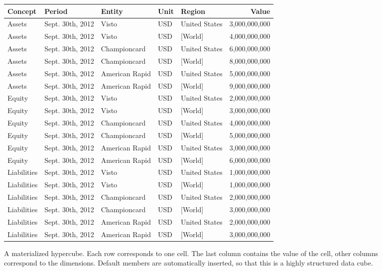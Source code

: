 \documentclass{acm_proc_article-sp}
\begin{document}
\begin{figure*}
\centering
\begin{tabular}{lllllr}
\hline
\hline
Concept & Period & Entity & Unit & Region & Value \\
\hline
Assets & Sept. 30th, 2012 & Visto & USD & United States & 3,000,000,000 \\
Assets & Sept. 30th, 2012 & Visto & USD & [World] & 4,000,000,000 \\
Assets & Sept. 30th, 2012 & Championcard & USD & United States & 6,000,000,000 \\
Assets & Sept. 30th, 2012 & Championcard & USD & [World] & 8,000,000,000 \\
Assets & Sept. 30th, 2012 & American Rapid & USD & United States & 5,000,000,000 \\
Assets & Sept. 30th, 2012 & American Rapid & USD & [World] & 9,000,000,000 \\
Equity & Sept. 30th, 2012 & Visto & USD & United States & 2,000,000,000 \\
Equity & Sept. 30th, 2012 & Visto &USD &  [World] & 3,000,000,000 \\
Equity & Sept. 30th, 2012 & Championcard & USD & United States & 4,000,000,000 \\
Equity & Sept. 30th, 2012 & Championcard & USD & [World] & 5,000,000,000 \\
Equity & Sept. 30th, 2012 & American Rapid & USD & United States & 3,000,000,000 \\
Equity & Sept. 30th, 2012 & American Rapid & USD & [World] & 6,000,000,000 \\
Liabilities & Sept. 30th, 2012 & Visto & USD & United States & 1,000,000,000 \\
Liabilities & Sept. 30th, 2012 & Visto & USD & [World] & 1,000,000,000 \\
Liabilities & Sept. 30th, 2012 & Championcard & USD & United States & 2,000,000,000 \\
Liabilities & Sept. 30th, 2012 & Championcard & USD & [World] & 3,000,000,000 \\
Liabilities & Sept. 30th, 2012 & American Rapid & USD & United States & 2,000,000,000 \\
Liabilities & Sept. 30th, 2012 & American Rapid & USD & [World] & 3,000,000,000 \\
\hline
\end{tabular}
\caption{A materialized hypercube. Each row corresponds to one cell. The last column contains the value of the cell, other columns correspond to the dimensions. Default members are automatically inserted, so that this is a highly structured data cube.}
\label{fig-materialized}
\end{figure*}
\end{document}
